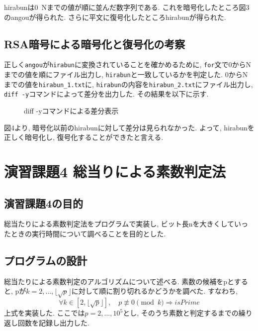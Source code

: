 \documentclass[xelatex, 11pt, a4paper, ja=standard]{bxjsarticle}
\begin{document}
hirabunは0~Nまでの値が順に並んだ数字列である. これを暗号化したところ図3のangouが得られた. 
さらに平文に復号化したところhirabunが得られた. 

\subsection{RSA暗号による暗号化と復号化の考察}
正しく\texttt{angou}が\texttt{hirabun}に変換されていることを確かめるために, \texttt{for}文で0からNまでの値を順にファイル出力し, \texttt{hirabun}と一致しているかを判定した. 
0からNまでの値を\texttt{hirabun\_1.txt}に, \texttt{hirabun}の内容を\texttt{hirabun\_2.txt}にファイル出力し, \texttt{diff -y}コマンドによって差分を出力した. その結果を以下に示す. 

\begin{figure}[htbp]
    \centering
    \begin{center}
\end{center}
\caption{diff -yコマンドによる差分表示}
\label{fig:screenshot}
\end{figure}

図4より, 暗号化以前のhirabunに対して差分は見られなかった. 
よって, hirabunを正しく暗号化し, 復号化することができたと言える. 


\section{演習課題4 総当りによる素数判定法}
\subsection{演習課題4の目的}
総当たりによる素数判定法をプログラムで実装し, ビット長nを大きくしていったときの実行時間について調べることを目的とした. 

\subsection{プログラムの設計}
総当たりによる素数判定のアルゴリズムについて述べる. 
素数の候補をpとすると, pが$k=2, ... , \lfloor \sqrt{p} \rfloor$に対して順に割り切れるかどうかを調べた. 
すなわち, 
\begin{equation*}
    \forall k \in [2, \lfloor \sqrt{p} \rfloor], \quad p \not\equiv 0 \pmod{k} \Rightarrow isPrime
\end{equation*}
上式を実装した. 
ここでは$p=2,...,10^5$とし, そのうち素数と判定するまでの繰り返し回数を記録し出力した. 
\end{document}
